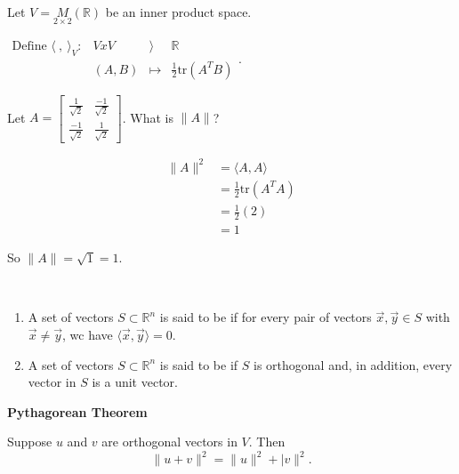 \documentclass[11pt,fleqn]{book} %
\begin{document}
\begin{example}
{~~~}

    Let $V = \underset{2\times2}{M}(\mathbb{R})$ be an inner product space. 

    $\begin{matrix} \text{Define } \langle ~,~ \rangle_V: &V x V &\rangle &\mathbb{R} \\ &(A, B) &\mapsto &\frac{1}{2}\mathrm{tr}(A^TB) \end{matrix}$. 

    Let $A = \begin{bmatrix} \frac{1}{\sqrt{2}} &\frac{-1}{\sqrt{2}} \\ \frac{-1}{\sqrt{2}} &\frac{1}{\sqrt{2}} \end{bmatrix}$. What is $\|A\|$? 

    \begin{align*}
        \|A\|^2
        &= \langle A, A \rangle
        \\
        &= \frac{1}{2}\mathrm{tr}(A^TA)
        \\
        &= \frac{1}{2}(2)
        \\
        &= 1
    \end{align*}
    
    So $\|A\| = \sqrt{1} = 1$. 
\end{example}

\setcounter{chapter}{4}
\setcounter{definitionT}{8}
\begin{definition}
$\text{ }$

    \begin{enumerate}[label=\alph*)]
        \item A set of vectors $S \subset \mathbb{R}^n$ is said to be  if for every pair of vectors $\vec{x}, \vec{y} \in S$ with $\vec{x} \neq \vec{y}$, wc have $\langle \vec{x}, \vec{y} \rangle = 0$.
        \item A set of vectors $S \subset \mathbb{R}^n$ is said to be  if $S$ is orthogonal and, in addition, every vector in $S$ is a unit vector.
    \end{enumerate}
\end{definition}
\setcounter{chapter}{3}

\textbf{Pythagorean Theorem}

Suppose $u$ and $v$ are orthogonal vectors in $V$. Then $$\|u + v\|^2 = \|u\|^2 + |v\|^2. $$
\end{document}
